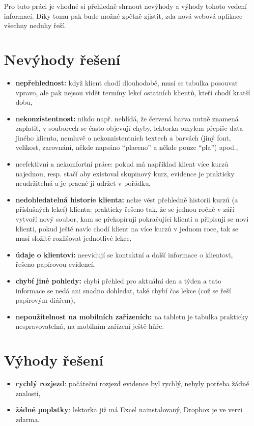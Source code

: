 Pro tuto práci je vhodné si přehledně shrnout nevýhody a výhody tohoto vedení informací. Díky tomu pak bude možné zpětně zjistit, zda nová webová aplikace všechny neduhy řeší.

    \section{Nevýhody řešení}
        \begin{itemize}
            \item \textbf{nepřehlednost:} když klient chodí dlouhodobě, musí se tabulka posouvat vpravo, ale pak nejsou vidět termíny lekcí ostatních klientů, kteří chodí kratší dobu,
            \item \textbf{nekonzistentnost:} nikdo např. nehlídá, že červená barva nutně znamená zaplatit, v souborech se často objevují chyby, lektorka omylem přepíše data jiného klienta, nemluvě o nekonzistentních textech a barvách (jiný font, velikost, zarovnání, někde napsáno \enquote{placeno} a někde pouze \enquote{pla}) apod.,
            \item neefektivní a nekomfortní práce: pokud má například klient více kurzů najednou, resp. stačí aby existoval skupinový kurz, evidence je prakticky neudržitelná a je pracné ji udržet v pořádku,
            \item \textbf{nedohledatelná historie klienta:} nelze vést přehledně historii kurzů (a příslušných lekcí) klienta: prakticky řešeno tak, že se jednou ročně v září vytvoří nový soubor, kam se překopírují pokračující klienti a připisují se noví klienti, pokud ještě navíc chodí klient na více kurzů v jednom roce, tak se musí složitě rozlišovat jednotlivé lekce,
            \item \textbf{údaje o klientovi:} neevidují se kontaktní a další informace o klientovi, řešeno papírovou evidencí,
            \item \textbf{chybí jiné pohledy:} chybí přehled pro aktuální den a týden a tato informace se nedá ani snadno dohledat, také chybí čas lekce (což se řeší papírovým diářem),
            \item \textbf{nepoužitelnost na mobilních zařízeních:} na tabletu je tabulka prakticky nespravovatelná, na mobilním zařízení ještě hůře.
        \end{itemize}
    
    \section{Výhody řešení}
        \begin{itemize}
            \item \textbf{rychlý rozjezd}: počáteční rozjezd evidence byl rychlý, nebyly potřeba žádné znalosti,
            \item \textbf{žádné poplatky}: lektorka již má Excel nainstalovaný, Dropbox je ve verzi zdarma.
        \end{itemize}
    
